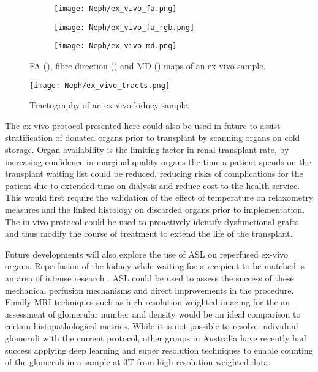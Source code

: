 \begin{figure}[H]
	\centering
	\begin{subfigure}[c]{0.31\textwidth}
		\centering
		\texttt{[image: Neph/ex\_vivo\_fa.png]} %
		\caption{}
		\label{fig:ex_ex_dti_fa}
	\end{subfigure}
	\hfill
	\begin{subfigure}[c]{0.31\textwidth}
		\centering
		\texttt{[image: Neph/ex\_vivo\_fa\_rgb.png]} %
		\caption{}
		\label{fig:ex_ex_dti_fa_rgb}
	\end{subfigure}
	\hfill	
	\begin{subfigure}[c]{0.31\textwidth}
		\centering
		\texttt{[image: Neph/ex\_vivo\_md.png]} %
		\caption{}
		\label{fig:ex_ex_dti_md}
	\end{subfigure}
	\caption{\ac{FA} (), fibre direction () and \ac{MD} () maps of an ex-vivo sample.}
	\label{fig:ex_ex_dti_maps}
\end{figure}

\begin{figure}[H]
	\centering
	\texttt{[image: Neph/ex\_vivo\_tracts.png]} %
	\caption{Tractography of an ex-vivo kidney sample.}
	\label{fig:ex_ex_tracts}	
\end{figure}

The ex-vivo protocol presented here could also be used in future to assist stratification of donated organs prior to transplant by scanning organs on cold storage. Organ availability is the limiting factor in renal transplant rate, by increasing confidence in marginal quality organs the time a patient spends on the transplant waiting list could be reduced, reducing risks of complications for the patient due to extended time on dialysis and reduce cost to the health service. This would first require the validation of the effect of temperature on relaxometry measures and the linked histology on discarded organs prior to implementation. The in-vivo protocol could be used to proactively identify dysfunctional grafts and thus modify the course of treatment to extend the life of the transplant.

Future developments will also explore the use of \ac{ASL} on reperfused ex-vivo organs. Reperfusion of the kidney while waiting for a recipient to be matched is an area of intense research \cite{bellini_cold_2019,moers_value_2010,wight_pulsatile_2003}. \ac{ASL} could be used to assess the success of these mechanical perfusion mechanisms and direct improvements in the procedure. Finally \ac{MRI} techniques such as high resolution \ttwostar weighted imaging for the an assessment of glomerular number and density would be an ideal comparison to certain histopathological metrics. While it is not possible to resolve individual glomeruli with the current protocol, other groups in Australia have recently had success applying deep learning and super resolution techniques to enable counting of the glomeruli in a sample at 3T from high resolution \ttwostar weighted data.



